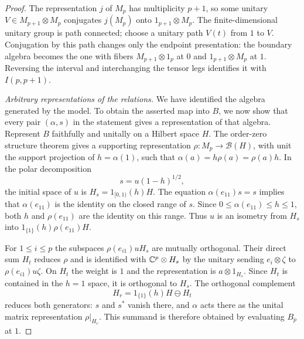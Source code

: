 \begin{proof}
The representation $j$ of $M_p$ has multiplicity $p+1$, so some
unitary $V\in M_{p+1}\otimes M_p$ conjugates $j(M_p)$ onto
$1_{p+1}\otimes M_p$.  The finite-dimensional unitary group is
path connected; choose a unitary path $V(t)$ from $1$ to $V$.
Conjugation by this path changes only the endpoint presentation:
the boundary algebra becomes the one with fibers
$M_{p+1}\otimes1_p$ at $0$ and $1_{p+1}\otimes M_p$ at $1$.
Reversing the interval and interchanging the tensor legs identifies
it with $I(p,p+1)$.

\emph{Arbitrary representations of the relations.}
We have identified the algebra generated by the model. To obtain the
asserted map into $B$, we now show that every pair $(\alpha,s)$ in the
statement gives a representation of that algebra. Represent $B$ faithfully and
unitally on a Hilbert space $H$.  The order-zero structure theorem
gives a supporting representation $\rho:M_p\to\mathcal B(H)$,
with unit the support projection of $h=\alpha(1)$, such that
$\alpha(a)=h\rho(a)=\rho(a)h$.
In the polar decomposition
\[
 s=u(1-h)^{1/2},
\]
the initial space of $u$ is
$H_s=1_{[0,1)}(h)H$.  The equation $\alpha(e_{11})s=s$ implies
that $\alpha(e_{11})$ is the identity on the closed range of $s$.
Since $0\le\alpha(e_{11})\le h\le1$, both $h$ and
$\rho(e_{11})$ are the identity on this range.  Thus $u$ is an
isometry from $H_s$ into
$1_{\{1\}}(h)\rho(e_{11})H$.

For $1\le i\le p$ the subspaces
$\rho(e_{i1})uH_s$ are mutually orthogonal.  Their direct sum
$H_t$ reduces $\rho$ and is identified with $\mathbb C^p\otimes H_s$
by the unitary sending $e_i\otimes\zeta$ to
$\rho(e_{i1})u\zeta$.  On $H_t$ the weight is $1$ and the
representation is $a\otimes1_{H_s}$.  Since $H_t$ is contained
in the $h=1$ space, it is orthogonal to $H_s$.
The orthogonal complement
\[
 H_r=1_{\{1\}}(h)H\ominus H_t
\]
reduces both generators: $s$ and $s^*$ vanish there, and $\alpha$
acts there as the unital matrix representation $\rho|_{H_r}$.
This summand is therefore obtained by evaluating $B_p$ at $1$.


\end{proof}
